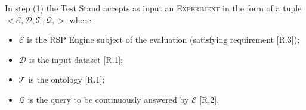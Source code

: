 \noindent In step (1) the Test Stand accepts as input an \textsc{Experiment} in the form of a tuple $<\mathcal{E},\mathcal{D},\mathcal{T},\mathcal{Q},>$ where:
\begin{itemize}
\item $\mathcal{E}$ is the RSP Engine subject of the evaluation (satisfying requirement [R.3]); 
\item $\mathcal{D}$ is the input dataset [R.1]; 
\item $\mathcal{T}$ is the ontology [R.1]; 
\item $\mathcal{Q}$ is the query to be continuously answered by $\mathcal{E}$ [R.2]. 
\end{itemize}
                                                                                                                                                                                                                                                                                                                                                                                                                                                                                                                                                                                                                                                                                                                                                                                                                                                                                                                                                                                                                                                                                                                                                                                                                                                                                                                                                                                                                                                                                                                                                                                                                                                                                                                                                                                                                                                                                                                                                                                                                                                                                                                                                                                                                                                                                                                                                                                                                                                                                                                                                                                                                                                                                                                              